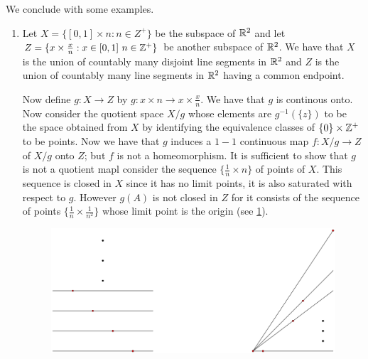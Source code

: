We conclude with some examples.

\begin{example}
    \begin{enumerate}[label=(\arabic*)]
        \item Let $X=\{[0,1] \times n:n \in Z^+\}$ be the subspace of $\mathbb{R}^2$ and let  $Z=\{x \times
            \frac{x}{n}: x \in [0,1] \text{ } n \in \mathbb{Z}^+\}$ be another subspace of $\mathbb{R}^2$. We have
            that  $X$ is the union of countably many disjoint line segments in  $\mathbb{R}^2$ and  $Z$ is
            the union of countably many line segments in  $\mathbb{R}^2$ having a common endpoint.

            Now define $g:X \rightarrow Z$ by  $g:x \times n \rightarrow x \times \frac{x}{n}$. We
            have that $g$ is continous onto. Now consider the quotient space  $X/g$ whose elements
            are  $g^{-1}(\{z\})$ to be the space obtained from $X$ by identifying the equivalence
            classes of $\{0\} \times \mathbb{Z}^+$ to be points. Now we have that $g$ induces a  $1-1$
            continuous map  $f:X/g \rightarrow Z$ of  $X/g$ onto  $Z$; but  $f$ is not a
            homeomorphism. It is sufficient to show that  $g$ is not a quotient mapl consider the
            sequence  $\{\frac{1}{n} \times n\}$ of points of $X$. This sequence is closed in  $X$
            since it has no limit points, it is also saturated with respect to  $g$. However  $g(A)$
            is not closed in $Z$ for it consists of the sequence of points  $\{\frac{1}{n} \times
            \frac{1}{n^2}\}$ whose limit point is the origin (see \ref{fig_2.6}).

            \begin{figure}[h]
                \centering
                \includegraphics[scale = 0.2]{Figures/Chapter2/nonHomeomorphicPoints.eps}
                \caption{}
                \label{fig_2.6}
            \end{figure}


\end{enumerate}
\end{example}
